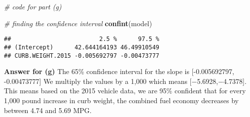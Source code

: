\documentclass[
]{article}
\newenvironment{Shaded}{\begin{snugshade}}{\end{snugshade}}
\newcommand{\CommentTok}[1]{\textcolor[rgb]{0.56,0.35,0.01}{\textit{#1}}}
\newcommand{\FunctionTok}[1]{\textcolor[rgb]{0.13,0.29,0.53}{\textbf{#1}}}
\newcommand{\NormalTok}[1]{#1}
\begin{document}
\begin{Shaded}
\begin{Highlighting}[]
\CommentTok{\# code for part (g)}

\CommentTok{\# finding the confidence interval}
\FunctionTok{confint}\NormalTok{(model)}
\end{Highlighting}
\end{Shaded}

\begin{verbatim}
##                         2.5 %      97.5 %
## (Intercept)      42.644164193 46.49910549
## CURB.WEIGHT.2015 -0.005692797 -0.00473777
\end{verbatim}

\textbf{Answer for (g)} The 65\% confidence interval for the slope is
{[}-0.005692797, -0.00473777{]} We multiply the values by a 1,000 which
means {[}−5.6928,−4.7378{]}. This means based on the 2015 vehicle data,
we are 95\% confident that for every 1,000 pound increase in curb
weight, the combined fuel economy decreases by between 4.74 and 5.69
MPG.
\end{document}
